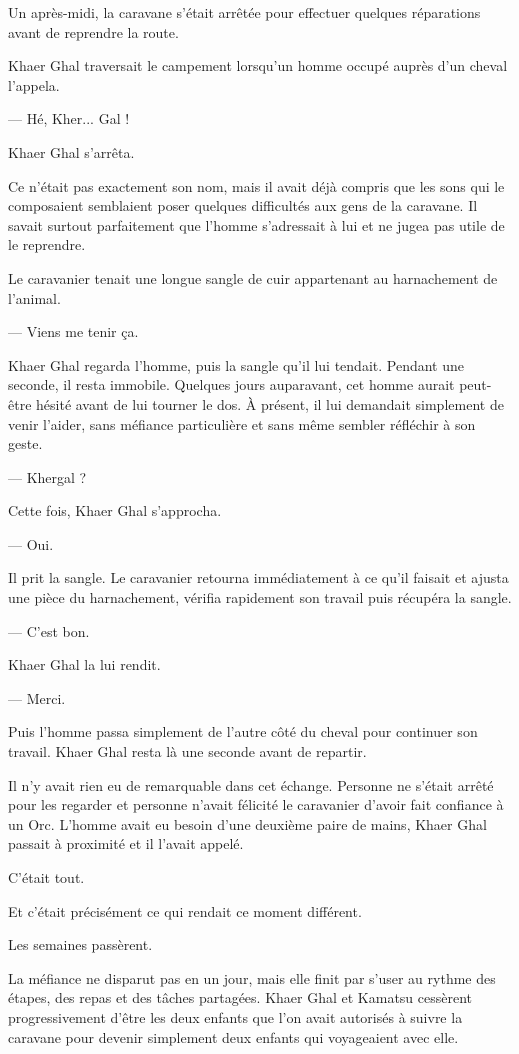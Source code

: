 Un après-midi, la caravane s'était arrêtée pour effectuer quelques réparations
avant de reprendre la route.

Khaer Ghal traversait le campement lorsqu'un homme occupé auprès d'un cheval
l'appela.

— Hé, Kher... Gal !

Khaer Ghal s'arrêta.

Ce n'était pas exactement son nom, mais il avait déjà compris que les sons qui
le composaient semblaient poser quelques difficultés aux gens de la caravane.
Il savait surtout parfaitement que l'homme s'adressait à lui et ne jugea pas
utile de le reprendre.

Le caravanier tenait une longue sangle de cuir appartenant au harnachement de
l'animal.

— Viens me tenir ça.

Khaer Ghal regarda l'homme, puis la sangle qu'il lui tendait. Pendant une
seconde, il resta immobile. Quelques jours auparavant, cet homme aurait
peut-être hésité avant de lui tourner le dos. À présent, il lui demandait
simplement de venir l'aider, sans méfiance particulière et sans même sembler
réfléchir à son geste.

— Khergal ?

Cette fois, Khaer Ghal s'approcha.

— Oui.

Il prit la sangle. Le caravanier retourna immédiatement à ce qu'il faisait et
ajusta une pièce du harnachement, vérifia rapidement son travail puis récupéra
la sangle.

— C'est bon.

Khaer Ghal la lui rendit.

— Merci.

Puis l'homme passa simplement de l'autre côté du cheval pour continuer son
travail. Khaer Ghal resta là une seconde avant de repartir.

Il n'y avait rien eu de remarquable dans cet échange. Personne ne s'était
arrêté pour les regarder et personne n'avait félicité le caravanier d'avoir
fait confiance à un Orc. L'homme avait eu besoin d'une deuxième paire de mains,
Khaer Ghal passait à proximité et il l'avait appelé.

C'était tout.

Et c'était précisément ce qui rendait ce moment différent.

\scenebreak

Les semaines passèrent.

La méfiance ne disparut pas en un jour, mais elle finit par s'user au rythme
des étapes, des repas et des tâches partagées. Khaer Ghal et Kamatsu cessèrent
progressivement d'être les deux enfants que l'on avait autorisés à suivre la
caravane pour devenir simplement deux enfants qui voyageaient avec elle.

